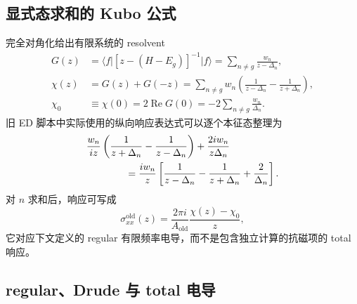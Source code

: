 \documentclass[11pt]{article}
\begin{document}
\subsection{显式态求和的 Kubo 公式}

完全对角化给出有限系统的 resolvent
\begin{align}
  G(z)
  &=\langle f\rvert\left[z-(H-E_g)\right]^{-1}\lvert f\rangle
    =\sum_{n\ne g}\frac{w_n}{z-\Delta_n}, \\
  \chi(z)
  &=G(z)+G(-z)
    =\sum_{n\ne g}w_n
      \left(\frac{1}{z-\Delta_n}-\frac{1}{z+\Delta_n}\right), \\
  \chi_0
  &\equiv\chi(0)=2\operatorname{Re}G(0)
    =-2\sum_{n\ne g}\frac{w_n}{\Delta_n}.
  \label{eq:exact-resolvent}
\end{align}
旧 ED 脚本中实际使用的纵向响应表达式可以逐个本征态整理为
\begin{align}
 &\frac{w_n}{iz}
  \left(\frac{1}{z+\Delta_n}-\frac{1}{z-\Delta_n}\right)
  +\frac{2iw_n}{z\Delta_n} \\
 &\hspace{1.4cm}=\frac{iw_n}{z}
  \left[
    \frac{1}{z-\Delta_n}-\frac{1}{z+\Delta_n}
    +\frac{2}{\Delta_n}
  \right].
\end{align}
对 \(n\) 求和后，响应可写成
\begin{equation}
  \sigma_{xx}^{\mathrm{old}}(z)
  =\frac{2\pi i}{A_{\mathrm{old}}}
   \frac{\chi(z)-\chi_0}{z},
  \label{eq:old-kubo}
\end{equation}
它对应下文定义的 regular 有限频率电导，而不是包含独立计算的抗磁项的 total 响应。

\subsection{regular、Drude 与 total 电导}
\end{document}
